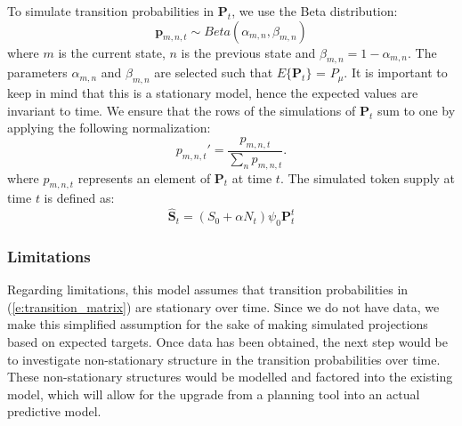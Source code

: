 \documentclass{article}
\begin{document}
To simulate transition probabilities in $\mathbf{P}_{t}$, we use the Beta distribution:
\begin{equation}
\mathbf{p}_{m,n,t} \sim Beta(\alpha_{m,n},\beta_{m,n})
\end{equation}
where $m$ is the current state, $n$ is the previous state and $\beta_{m,n} = 1-\alpha_{m,n}$. The parameters $\alpha_{m,n}$ and $\beta_{m,n}$ are selected such that $E\{\mathbf{P}_{t}\}$ = $P_{\mu}$. It is important to keep in mind that this is a stationary model, hence the expected values are invariant to time. We ensure that the rows of the simulations of $\mathbf{P}_{t}$ sum to one by applying the following normalization:
\begin{equation}
p_{m,n,t}'= \dfrac{p_{m,n,t} }{  \sum_{n} p_{m,n,t}  }.
\end{equation}
where $p_{m,n,t}$ represents an element of $\mathbf{P}_{t}$ at time $t$. The simulated token supply  at time $t$ is defined as:
\begin{equation}
\hat{\mathbf{S}}_{t} =(S_{0} + \alpha N_{t})\psi_{0}\mathbf{P}_{t}^{t}
\label{e:token_supply_simulation}
\end{equation}

\subsubsection{Limitations}

Regarding limitations, this model assumes that transition probabilities in (\ref{e:transition_matrix}) are stationary over time. Since we do not have data, we make this simplified assumption for the sake of making simulated projections based on expected targets. Once data has been obtained, the next step would be to investigate non-stationary structure in the transition probabilities over time. These non-stationary structures would be modelled and factored into the existing model, which will allow for the upgrade from a planning tool into an actual predictive model.

\label{section:summary}
\end{document}

